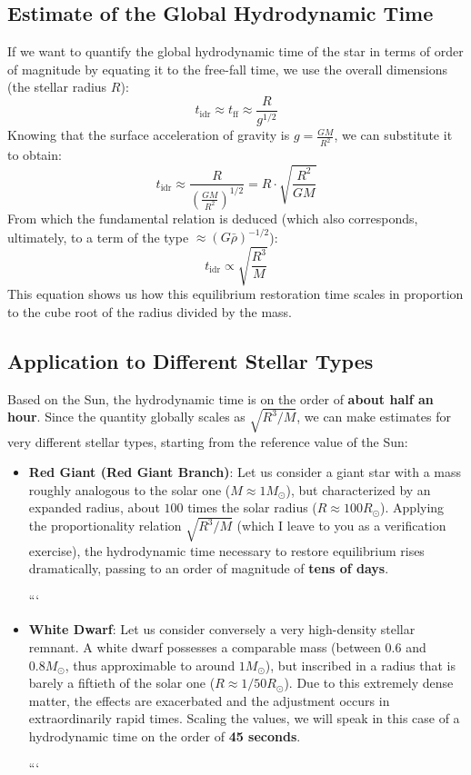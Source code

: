 \subsection{Estimate of the Global Hydrodynamic Time}
If we want to quantify the global hydrodynamic time of the star in terms of order of magnitude by equating it to the free-fall time, we use the overall dimensions (the stellar radius $R$):
\begin{equation}
t_{\text{idr}} \approx t_{\text{ff}} \approx \frac{R}{g^{1/2}}
\end{equation}
Knowing that the surface acceleration of gravity is $g = \frac{GM}{R^2}$, we can substitute it to obtain:
\begin{equation}
t_{\text{idr}} \approx \frac{R}{\left( \frac{GM}{R^2} \right)^{1/2}} = R \cdot \sqrt{\frac{R^2}{GM}}
\end{equation}
From which the fundamental relation is deduced (which also corresponds, ultimately, to a term of the type $\approx (G\bar{\rho})^{-1/2}$):
\begin{equation}
t_{\text{idr}} \propto \sqrt{\frac{R^3}{M}}
\end{equation}
This equation shows us how this equilibrium restoration time scales in proportion to the cube root of the radius divided by the mass.

\subsection{Application to Different Stellar Types}
Based on the Sun, the hydrodynamic time is on the order of \textbf{about half an hour}. Since the quantity globally scales as $\sqrt{R^3/M}$, we can make estimates for very different stellar types, starting from the reference value of the Sun:

\begin{itemize}
\item \textbf{Red Giant (Red Giant Branch)}: Let us consider a giant star with a mass roughly analogous to the solar one ($M \approx 1 M_\odot$), but characterized by an expanded radius, about $100$ times the solar radius ($R \approx 100 R_\odot$). Applying the proportionality relation $\sqrt{R^3/M}$ (which I leave to you as a verification exercise), the hydrodynamic time necessary to restore equilibrium rises dramatically, passing to an order of magnitude of \textbf{tens of days}.

```
\item \textbf{White Dwarf}: Let us consider conversely a very high-density stellar remnant. A white dwarf possesses a comparable mass (between $0.6$ and $0.8 M_\odot$, thus approximable to around $1 M_\odot$), but inscribed in a radius that is barely a fiftieth of the solar one ($R \approx 1/50 R_\odot$). Due to this extremely dense matter, the effects are exacerbated and the adjustment occurs in extraordinarily rapid times. Scaling the values, we will speak in this case of a hydrodynamic time on the order of \textbf{45 seconds}.


```

\end{itemize}

